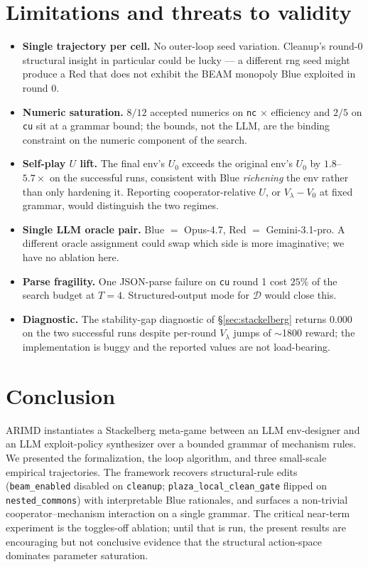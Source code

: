 \documentclass[11pt]{article}
\begin{document}
\section{Limitations and threats to validity}
\label{sec:limitations}
\begin{itemize}[itemsep=2pt, topsep=2pt]
  \item \textbf{Single trajectory per cell.}  No outer-loop seed
        variation.  Cleanup's round-0 structural insight in
        particular could be lucky — a different rng seed might
        produce a Red that does not exhibit the BEAM monopoly Blue
        exploited in round 0.
  \item \textbf{Numeric saturation.}  $8/12$ accepted numerics on
        \texttt{nc} $\times$ efficiency and $2/5$ on \texttt{cu}
        sit at a grammar bound; the bounds, not the LLM, are the
        binding constraint on the numeric component of the search.
  \item \textbf{Self-play $U$ lift.}  The final env's $U_0$
        exceeds the original env's $U_0$ by $1.8$–$5.7\times$ on
        the successful runs, consistent with Blue \emph{richening}
        the env rather than only hardening it.  Reporting
        cooperator-relative $U$, or $V_\lambda - V_0$ at fixed
        grammar, would distinguish the two regimes.
  \item \textbf{Single LLM oracle pair.}  Blue $=$ Opus-4.7,
        Red $=$ Gemini-3.1-pro.  A different oracle assignment
        could swap which side is more imaginative; we have no
        ablation here.
  \item \textbf{Parse fragility.}  One JSON-parse failure on
        \texttt{cu} round 1 cost $25\%$ of the search budget at
        $T=4$.  Structured-output mode for $\mathcal{D}$ would
        close this.
  \item \textbf{Diagnostic.}  The stability-gap diagnostic of
        \S\ref{sec:stackelberg} returns $0.000$ on the two
        successful runs despite per-round $V_\lambda$ jumps of
        $\sim$1800 reward; the implementation is buggy and the
        reported values are not load-bearing.
\end{itemize}

\section{Conclusion}
ARIMD instantiates a Stackelberg meta-game between an LLM
env-designer and an LLM exploit-policy synthesizer over a bounded
grammar of mechanism rules.  We presented the formalization, the
loop algorithm, and three small-scale empirical trajectories.
The framework recovers structural-rule edits (\texttt{beam\_enabled}
disabled on \texttt{cleanup}; \texttt{plaza\_local\_clean\_gate}
flipped on \texttt{nested\_commons}) with interpretable Blue
rationales, and surfaces a non-trivial cooperator–mechanism
interaction on a single grammar.  The critical near-term
experiment is the toggles-off ablation; until that is run, the
present results are encouraging but not conclusive evidence that
the structural action-space dominates parameter saturation.
\end{document}
